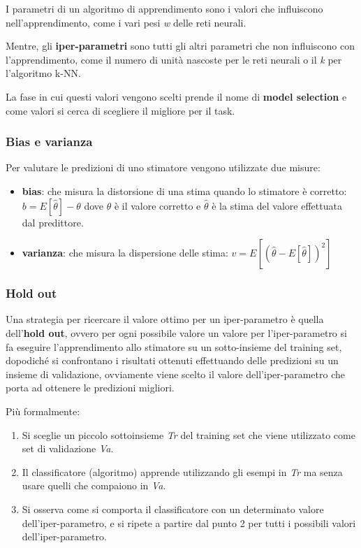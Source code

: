 I parametri di un algoritmo di apprendimento sono i valori che influiscono nell'apprendimento, come i
vari pesi \emph{w} delle reti neurali. 

Mentre, gli \textbf{iper-parametri} sono tutti gli
altri parametri che non influiscono con l'apprendimento, come il numero
di unità nascoste per le reti neurali o il \emph{k} per l'algoritmo
k-NN.

La fase in cui questi valori vengono scelti prende il nome di
\textbf{model selection} e come valori si cerca di scegliere il migliore
per il task.

\subsubsection{Bias e varianza}\label{bias-e-varianza}

Per valutare le predizioni di uno stimatore vengono utilizzate due
misure:

\begin{itemize}
\item \textbf{bias}: che misura la distorsione di una stima quando lo stimatore è corretto: $b = E[\hat{\theta}] - \theta$ dove $\theta$ è il valore corretto e $\hat{\theta}$ è la stima del valore effettuata dal predittore.

\item \textbf{varianza}: che misura la dispersione delle stima: $v = E[(\hat{\theta} - E[\hat{\theta}])^2 ]$
\end{itemize}


\subsubsection{Hold out}\label{hold-out}

Una strategia per ricercare il valore ottimo per un iper-parametro è
quella dell'\textbf{hold out}, ovvero per ogni possibile valore un
valore per l'iper-parametro si fa eseguire l'apprendimento allo
stimatore su un sotto-insieme del training set, dopodiché si confrontano
i risultati ottenuti effettuando delle predizioni su un insieme di
validazione, ovviamente viene scelto il valore dell'iper-parametro che
porta ad ottenere le predizioni migliori.

Più formalmente:

\begin{enumerate}
\def\labelenumi{\arabic{enumi}.}
\tightlist
\item
  Si sceglie un piccolo sottoinsieme \emph{Tr} del training set che
  viene utilizzato come set di validazione \emph{Va}.
\item
  Il classificatore (algoritmo) apprende utilizzando gli esempi in
  \emph{Tr} ma senza usare quelli che compaiono in \emph{Va}.
\item
  Si osserva come si comporta il classificatore con un determinato
  valore dell'iper-parametro, e si ripete a partire dal punto 2 per
  tutti i possibili valori dell'iper-parametro.
\end{enumerate}

